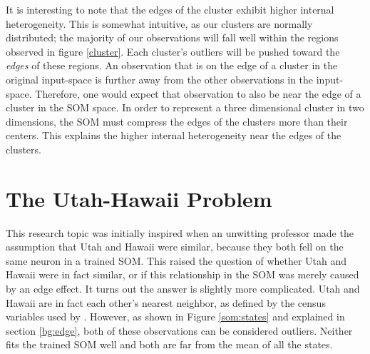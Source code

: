 It is interesting to note that the edges of the cluster exhibit higher internal heterogeneity.  
This is somewhat intuitive, as our clusters are normally distributed; the
majority of our observations will fall well within the regions observed in
figure \ref{cluster}. Each cluster's outliers will be pushed toward the
\emph{edges} of these regions. An observation that is on the edge of a cluster
in the original input-space is further away from the other observations in the
input-space.  Therefore, one would expect that observation to also be near the
edge of a cluster in the SOM space.  In order to represent a three dimensional
cluster in two dimensions, the SOM must compress the edges of the clusters
more than their centers.  This explains the higher internal heterogeneity near
the edges of the clusters. 




\section{The Utah-Hawaii Problem}
\label{states}
This research topic was initially inspired when an unwitting professor made
the assumption that Utah and Hawaii were similar, because they both fell on
the same neuron in a trained SOM.  This raised the question of whether Utah and
Hawaii were in fact similar, or if this relationship in the SOM was merely
caused by an edge effect.  It turns out the answer is slightly more
complicated.  Utah and Hawaii are in fact each other's nearest neighbor, as
defined by the census variables used by \cite{skupin08}.  However, as shown in
Figure \ref{som:states} and explained in section \ref{bg:edge}, both of these
observations can be considered outliers.  Neither fits the trained SOM well and both are
far from the mean of all the states.

